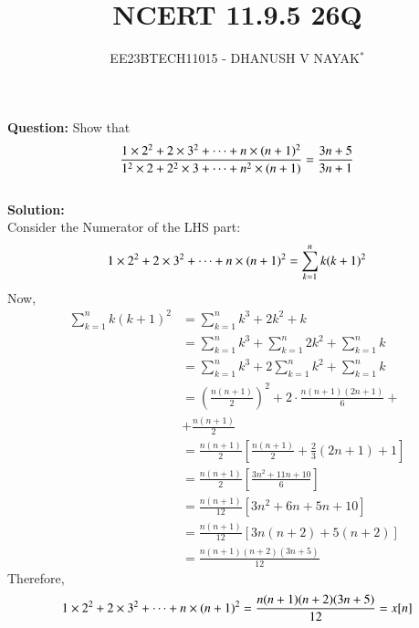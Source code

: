 \documentclass[journal,12pt,twocolumn]{IEEEtran}
\theoremstyle{remark}
\begin{document}

\vspace{3cm}

\title{NCERT 11.9.5 26Q}
\author{EE23BTECH11015 - DHANUSH V NAYAK$^{*}$%
}
\maketitle
\newpage
\bigskip

\renewcommand{\thefigure}{\theenumi}
\renewcommand{\thetable}{\theenumi}


\textbf{Question:} Show that
\begin{equation}
    \frac{1\times2^2 + 2\times3^2 + \dots + n\times(n+1)^2}{1^2\times2 + 2^2\times3 +\dots + n^2\times(n+1)} \notag = \frac{3n+5}{3n+1}
\end{equation}\\
\textbf{Solution:}\\
Consider the Numerator of the LHS part:
\begin{equation}
    1\times2^2 + 2\times3^2 + \dots + n\times(n+1)^2 = \sum_{k=1}^n k(k+1)^2 \notag
\end{equation}
Now,
\begin{align*}
    \sum_{k=1}^n k(k+1)^2 &= \sum_{k=1}^n k^3+2k^2+k\\
                          &=  \sum_{k=1}^n k^3 + \sum_{k=1}^n 2k^2 + \sum_{k=1}^n k\\
                          &=  \sum_{k=1}^n k^3 + 2\sum_{k=1}^n k^2 + \sum_{k=1}^n k\\
                          &= \left(\frac{n(n+1)}{2}\right)^{\scriptstyle 2} + 2\cdot \frac{n(n+1)(2n+1)}{6}+\\  &+\frac{n(n+1)}{2}\\
                          &= \frac{n(n+1)}{2}\left[\frac{n(n+1)}{2} + \frac{2}{3}(2n+1) + 1\right]\\
                          &= \frac{n(n+1)}{2}\left[\frac{3n^2 + 11n +10}{6}\right]\\
                          &= \frac{n(n+1)}{12}\left[3n^2 + 6n + 5n + 10\right]\\
                          &= \frac{n(n+1)}{12}\left[3n(n+2)+5(n+2)\right]\\
                          &= \frac{n(n+1)(n+2)(3n+5)}{12}
\end{align*}
Therefore,
\begin{equation}
   1\times2^2 + 2\times3^2 + \dots + n\times(n+1)^2 = \frac{n(n+1)(n+2)(3n+5)}{12} = x[n] \\\notag 
\end{equation}
\end{document}
